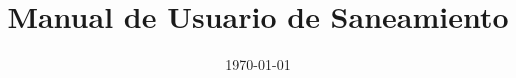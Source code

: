 ﻿\documentclass[12pt,a4paper]{article}
\title{Manual de Usuario de Saneamiento}
\author{}
\date{\today}
\begin{document}
\maketitle
\manualnotalinks
\manualnavegacion
\tableofcontents
\newpage



\bigskip
\manualnavegacion
\end{document}
